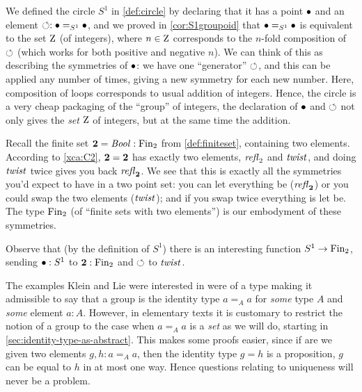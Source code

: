 \begin{example}\label{ex:base=base}
  We defined the circle $S^1$ in \cref{def:circle} by declaring that it has a point $\bullet$ and an element $\circlearrowleft:\bullet=_{S^1}\bullet$, and we proved in \cref{cor:S1groupoid} that $\bullet=_{S^1}\bullet$ is equivalent to the set $\mathrm{Z}$ (of integers), where $n\in\mathrm{Z}$ corresponds to the $n$-fold composition of $\circlearrowleft$ (which works for both positive and negative $n$).  
We can think of this as describing the symmetries of $\bullet$: we have one ``generator'' $\circlearrowleft$, and this can be applied any number of times, giving a new symmetry for each new number.  
Here, composition of loops corresponds to usual addition of integers.  Hence, the circle is a very cheap packaging of the ``{group}'' of integers, the declaration of $\bullet$ and $\circlearrowleft$ not only gives the \emph{set} $\mathrm{Z}$ of integers, but at the same time the addition.
\end{example}
\begin{example}
  Recall the finite set $\mathbf{2} =\mathop{\mathit{Bool}}:\operatorname{Fin}_2$ from \cref{def:finiteset}, containing two elements.   
According to \cref{xca:C2}, $\mathbf{2} =\mathbf{2} $ has exactly two elements, $\mathop{{\it refl}_{\mathrm 2}}$ and $\mathit{twist}$, and doing $\mathit{twist}$ twice gives you back $\mathop{{\it refl}_{\mathbf{2} }}$.  
We see that this is exactly all the symmetries you'd expect to have in a two point set: you can let everything be ($\mathop{{\it refl}_{\mathbf{2} }}$) or you could swap the two elements ($\mathit{twist}$); and if you swap twice everything is let be.  
The type $\operatorname{Fin}_2$ (of ``finite sets with two elements'') is our embodyment of these symmetries.  

Observe that (by the definition of $S^1$) there is an interesting function $S^1\to\operatorname{Fin}_2$, sending $\bullet:S^1$ to $\mathbf{2} :\operatorname{Fin}_2$ and $\circlearrowleft$ to $\mathit{twist}$.
\end{example}


The examples Klein and Lie were interested in were of a type making it admissible to say that a group is the identity type $a=_Aa$ for \emph{some} type $A$ and \emph{some} element $a:A$.
However, in elementary texts it is customary to restrict the notion of a group to the case when $a=_Aa$ is a \emph{set} as we will do, starting in \cref{sec:identity-type-as-abstract}.  This makes some proofs easier, since if are we given two elements $g,h:a=_Aa$, then the identity type $g=h$ is a proposition, \ie $g$ can be equal to $h$ in at most one way.  Hence questions relating to uniqueness will never be a problem.



